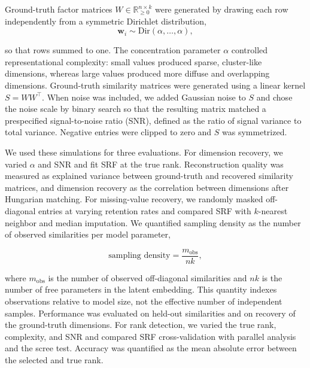 \documentclass{article}
\begin{document}
Ground-truth factor matrices $W \in \mathbb{R}_{\geq 0}^{n \times k}$ were generated by drawing each row independently from a symmetric Dirichlet distribution,
\begin{equation}
    \mathbf{w}_i \sim \mathrm{Dir}(\alpha, \ldots, \alpha),    
\end{equation}


so that rows summed to one. The concentration parameter $\alpha$ controlled representational complexity: small values produced sparse, cluster-like dimensions, whereas large values produced more diffuse and overlapping dimensions. Ground-truth similarity matrices were generated using a linear kernel $S = W W^\top$. When noise was included, we added Gaussian noise to $S$ and chose the noise scale by binary search so that the resulting matrix matched a prespecified signal-to-noise ratio (SNR), defined as the ratio of signal variance to total variance. Negative entries were clipped to zero and $S$ was symmetrized.

We used these simulations for three evaluations. For dimension recovery, we varied $\alpha$ and SNR and fit SRF at the true rank. Reconstruction quality was measured as explained variance between ground-truth and recovered similarity matrices, and dimension recovery as the correlation between dimensions after Hungarian matching. For missing-value recovery, we randomly masked off-diagonal entries at varying retention rates and compared SRF with $k$-nearest neighbor and median imputation. We quantified sampling density as the number of observed similarities per model parameter,

\begin{equation}
    \text{sampling density} = \frac{m_{\mathrm{obs}}}{nk},    
\end{equation}

where $m_{\mathrm{obs}}$ is the number of observed off-diagonal similarities and $nk$ is the number of free parameters in the latent embedding. This quantity indexes observations relative to model size, not the effective number of independent samples. Performance was evaluated on held-out similarities and on recovery of the ground-truth dimensions. For rank detection, we varied the true rank, complexity, and SNR and compared SRF cross-validation with parallel analysis and the scree test. Accuracy was quantified as the mean absolute error between the selected and true rank.
\end{document}
